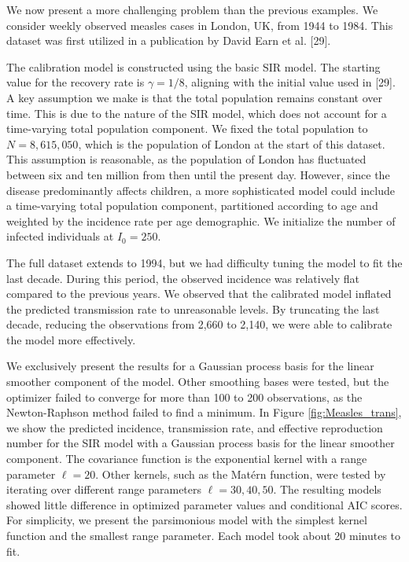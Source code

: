\documentclass[
11pt, %
oneside, %
english, %
singlespacing, %
]{macthesis} %
\begin{document}
We now present a more challenging problem than the previous examples. We consider weekly observed measles cases in London, UK, from 1944 to 1984. This dataset was first utilized in a publication by David Earn et al. {[}29{]}.

The calibration model is constructed using the basic SIR model. The starting value for the recovery rate is \(\gamma = 1/8\), aligning with the initial value used in {[}29{]}. A key assumption we make is that the total population remains constant over time. This is due to the nature of the SIR model, which does not account for a time-varying total population component. We fixed the total population to \(N = 8,615,050\), which is the population of London at the start of this dataset. This assumption is reasonable, as the population of London has fluctuated between six and ten million from then until the present day. However, since the disease predominantly affects children, a more sophisticated model could include a time-varying total population component, partitioned according to age and weighted by the incidence rate per age demographic. We initialize the number of infected individuals at \(I_0 = 250\).

The full dataset extends to 1994, but we had difficulty tuning the model to fit the last decade. During this period, the observed incidence was relatively flat compared to the previous years. We observed that the calibrated model inflated the predicted transmission rate to unreasonable levels. By truncating the last decade, reducing the observations from 2,660 to 2,140, we were able to calibrate the model more effectively.

We exclusively present the results for a Gaussian process basis for the linear smoother component of the model. Other smoothing bases were tested, but the optimizer failed to converge for more than 100 to 200 observations, as the Newton-Raphson method failed to find a minimum. In Figure \ref{fig:Measles_trans}, we show the predicted incidence, transmission rate, and effective reproduction number for the SIR model with a Gaussian process basis for the linear smoother component. The covariance function is the exponential kernel with a range parameter \(\ell = 20\). Other kernels, such as the Matérn function, were tested by iterating over different range parameters \(\ell = 30, 40, 50\). The resulting models showed little difference in optimized parameter values and conditional AIC scores. For simplicity, we present the parsimonious model with the simplest kernel function and the smallest range parameter. Each model took about 20 minutes to fit.
\end{document}

